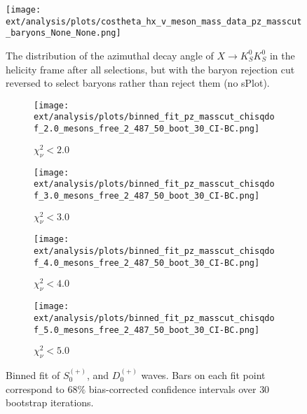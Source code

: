 \begin{figure}
  \begin{center}
    \texttt{[image: ext/analysis/plots/costheta\_hx\_v\_meson\_mass\_data\_pz\_masscut\_baryons\_None\_None.png]}
  \end{center}
  \caption{The distribution of the azimuthal decay angle of $X \to K_S^0K_S^0$ in the helicity frame after all selections, but with the baryon rejection cut reversed to select baryons rather than reject them (no sPlot).}\label{fig:costheta-hx-v-meson-mass-data-pz-masscut-baryons}
\end{figure}


\begin{figure}[htbp]
    \centering
    \begin{subfigure}{0.45\textwidth}
        \texttt{[image: ext/analysis/plots/binned\_fit\_pz\_masscut\_chisqdof\_2.0\_mesons\_free\_2\_487\_50\_boot\_30\_CI-BC.png]}
        \caption{$\chi^2_\nu < 2.0$}
    \end{subfigure}
    \hfill
    \begin{subfigure}{0.45\textwidth}
        \texttt{[image: ext/analysis/plots/binned\_fit\_pz\_masscut\_chisqdof\_3.0\_mesons\_free\_2\_487\_50\_boot\_30\_CI-BC.png]}
        \caption{$\chi^2_\nu < 3.0$}
    \end{subfigure}
    \vspace{1em}
    \begin{subfigure}{0.45\textwidth}
        \texttt{[image: ext/analysis/plots/binned\_fit\_pz\_masscut\_chisqdof\_4.0\_mesons\_free\_2\_487\_50\_boot\_30\_CI-BC.png]}
        \caption{$\chi^2_\nu < 4.0$}
    \end{subfigure}
    \hfill
    \begin{subfigure}{0.45\textwidth}
        \texttt{[image: ext/analysis/plots/binned\_fit\_pz\_masscut\_chisqdof\_5.0\_mesons\_free\_2\_487\_50\_boot\_30\_CI-BC.png]}
        \caption{$\chi^2_\nu < 5.0$}
    \end{subfigure}

    \caption{Binned fit of $S_{0}^{(+)}$, and $D_{0}^{(+)}$ waves. Bars on each fit point correspond to $68\%$ bias-corrected confidence intervals over $ 30 $ bootstrap iterations.}
    \label{fig:binned-fit-all-Sp-D0p}
\end{figure}

